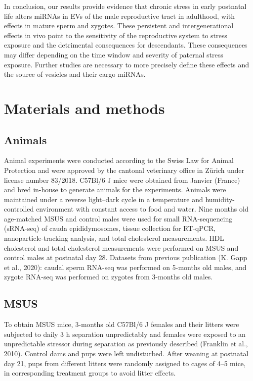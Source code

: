 \documentclass[12pt,twoside]{reedthesis}
\begin{document}
In conclusion, our results provide evidence that chronic stress in early postnatal life alters miRNAs in EVs of the male reproductive tract in adulthood, with effects in mature sperm and zygotes. These persistent and intergenerational effects in vivo point to the sensitivity of the reproductive system to stress exposure and the detrimental consequences for descendants. These consequences may differ depending on the time window and severity of paternal stress exposure. Further studies are necessary to more precisely define these effects and the source of vesicles and their cargo miRNAs.

\newpage

\hypertarget{materials-and-methods}{%
\section{Materials and methods}\label{materials-and-methods}}

\hypertarget{animals}{%
\subsection{Animals}\label{animals}}

Animal experiments were conducted according to the Swiss Law for Animal Protection and were approved by the cantonal veterinary office in Zürich under license number 83/2018. C57Bl/6 J mice were obtained from Janvier (France) and bred in-house to generate animals for the experiments. Animals were maintained under a reverse light--dark cycle in a temperature and humidity-controlled environment with constant access to food and water. Nine months old age-matched MSUS and control males were used for small RNA-sequencing (sRNA-seq) of cauda epididymosomes, tissue collection for RT-qPCR, nanoparticle-tracking analysis, and total cholesterol measurements. HDL cholesterol and total cholesterol measurements were performed on MSUS and control males at postnatal day 28. Datasets from previous publication (K. Gapp et al., 2020): caudal sperm RNA-seq was performed on 5-months old males, and zygote RNA-seq was performed on zygotes from 3-months old males.

\hypertarget{msus}{%
\subsection{MSUS}\label{msus}}

To obtain MSUS mice, 3-months old C57Bl/6 J females and their litters were subjected to daily 3 h separation unpredictably and females were exposed to an unpredictable stressor during separation as previously described (Franklin et al., 2010). Control dams and pups were left undisturbed. After weaning at postnatal day 21, pups from different litters were randomly assigned to cages of 4--5 mice, in corresponding treatment groups to avoid litter effects.
\end{document}
